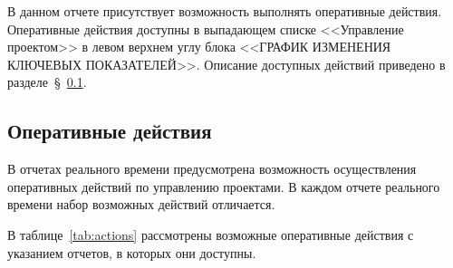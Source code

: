 В данном отчете присутствует возможность выполнять оперативные действия.
Оперативные действия доступны в выпадающем списке <<Управление проектом>> в левом верхнем углу блока <<ГРАФИК ИЗМЕНЕНИЯ КЛЮЧЕВЫХ ПОКАЗАТЕЛЕЙ>>.
Описание доступных действий приведено в разделе~\S~\ref{subsec:оперативные-действия}.

\subsection{Оперативные действия}\label{subsec:оперативные-действия}

В отчетах реального времени предусмотрена возможность осуществления оперативных действий по управлению проектами.
В каждом отчете реального времени набор возможных действий отличается.

В таблице~\ref{tab:actions} рассмотрены возможные оперативные действия с указанием отчетов, в которых они доступны.


